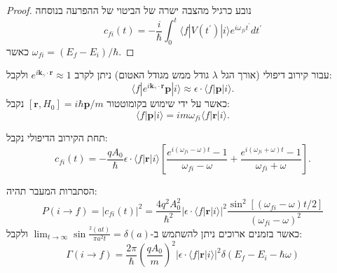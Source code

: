 \documentclass{tstextbook}
\begin{document}
\begin{proof}
נובע כרגיל מהצבה ישרה של הביטוי של ההפרעה בנוסחה
$$c_{f i}(t)=-\frac{i}{\hbar}\int_{0}^{t}\langle f|V(t^{\prime})|i\rangle e^{i\omega_{f i}t^{\prime}}d t^{\prime}$$
כאשר \(\omega_{f i}=(E_{f}-E_{i})/\hbar\).

\end{proof}
\begin{lemma}
עבור קירוב דיפולי (אורך הגל \(\lambda\) גודל ממש מגודל האטום) ניתן לקרב \(e^{ i\mathbf{k}_{\gamma}\cdot \mathbf{r} }\approx 1\) ולקבל:
$$\langle f|e^{i\mathbf{k}_{\gamma}\cdot\mathbf{r}}\mathbf{p}|i\rangle\approx\epsilon\cdot\langle f|\mathbf{p}|i\rangle.$$
כאשר על ידי שימוש בקומוטטור \(\left[ \mathbf{r},H_{0} \right]=i\hbar \mathbf{p} / m\) נקבל:
$$\langle f|\mathbf{p}|i\rangle=i m\omega_{f i}\langle f|\mathbf{r}|i\rangle.$$

\end{lemma}
\begin{corollary}
תחת הקירוב הדיפולי נקבל:
$$c_{f i}(t)=-\frac{q A_{0}}{\hbar}\epsilon\cdot\langle f|\mathbf{r}|i\rangle\left[\frac{e^{i(\omega_{f i}-\omega)t}-1}{\omega_{f i}-\omega}+\frac{e^{i(\omega_{f i}+\omega)t}-1}{\omega_{f i}+\omega}\right].$$

\end{corollary}
\begin{corollary}
הסתברות המעבר תהיה:
$$P(i\to f)=|c_{f i}(t)|^{2}=\frac{4q^{2}A_{0}^{2}}{\hbar^{2}}|\epsilon\cdot\langle f|\mathbf{r}|i\rangle|^{2}\frac{\sin^{2}\left[(\omega_{f i}-\omega)t/2\right]}{(\omega_{f i}-\omega)^{2}}$$
כאשר בזמנים ארוכים ניתן להשתמש ב-\(\lim_{ t \to \infty }\sin \frac{^2(at)}{\pi a^{2}t}=\delta(a)\) ולקבל:
$$\Gamma(i\to f)=\frac{2\pi}{\hbar}\left(\frac{q A_{0}}{m}\right)^{2}|\epsilon\cdot\langle f|\mathbf{r}|i\rangle|^{2}\delta(E_{f}-E_{i}-\hbar\omega)$$

\end{corollary}
\end{document}
